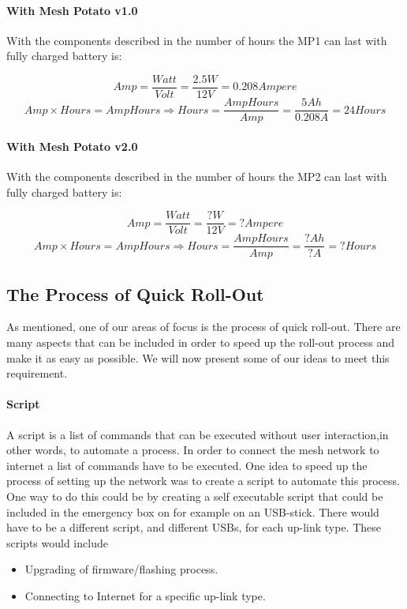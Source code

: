\paragraph{With Mesh Potato v1.0}
With the components described in  the number of hours the MP1 can last with fully charged battery is: 

$$Amp = \frac{Watt}{Volt} = \frac{2.5 W}{12 V} = 0.208 Ampere$$
$$Amp\times Hours = AmpHours \Rightarrow Hours = \frac{AmpHours}{Amp} = \frac{5 Ah}{0.208 A} = 24 Hours$$

\paragraph{With Mesh Potato v2.0}
With the components described in  the number of hours the MP2 can last with fully charged battery is: 

$$Amp = \frac{Watt}{Volt} = \frac{? W}{12 V} = ? Ampere$$
$$Amp\times Hours = AmpHours \Rightarrow Hours = \frac{AmpHours}{Amp} = \frac{? Ah}{? A} = ? Hours$$

\subsection{The Process of Quick Roll-Out}
As mentioned, one of our areas of focus is the process of quick roll-out. There are many aspects that can be included in order to speed up the roll-out process and make it as easy as possible. We will now present some of our ideas to meet this requirement.

\paragraph{Script}
A script is a list of commands that can be executed without user interaction,in other words, to automate a process. In order to connect the mesh network to internet a list of commands have to be executed. One idea to speed up the process of setting up the network was to create a script to automate this process. One way to do this could be by creating a self executable script that could be included in the emergency box on for example on an USB-stick. There would have to be a different script, and different USBs, for each up-link type. These scripts would include
\begin{itemize}
\item Upgrading of firmware/flashing process.
\item Connecting to Internet for a specific up-link type. 
\end{itemize}

